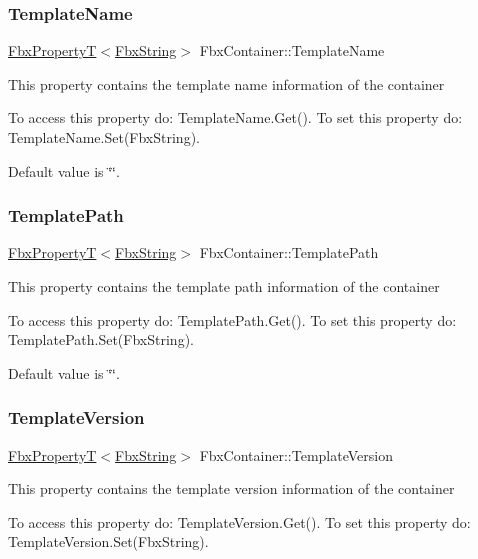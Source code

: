 \subsubsection{\texorpdfstring{Template\+Name}{TemplateName}}
{\footnotesize\ttfamily \hyperlink{class_fbx_property_t}{Fbx\+PropertyT}$<$\hyperlink{class_fbx_string}{Fbx\+String}$>$ Fbx\+Container\+::\+Template\+Name}

This property contains the template name information of the container

To access this property do\+: Template\+Name.\+Get(). To set this property do\+: Template\+Name.\+Set(\+Fbx\+String).

Default value is \char`\"{}\char`\"{}. \mbox{\label{class_fbx_container_a8d66563e359fda83e5b67017140e97d1}} 
\subsubsection{\texorpdfstring{Template\+Path}{TemplatePath}}
{\footnotesize\ttfamily \hyperlink{class_fbx_property_t}{Fbx\+PropertyT}$<$\hyperlink{class_fbx_string}{Fbx\+String}$>$ Fbx\+Container\+::\+Template\+Path}

This property contains the template path information of the container

To access this property do\+: Template\+Path.\+Get(). To set this property do\+: Template\+Path.\+Set(\+Fbx\+String).

Default value is \char`\"{}\char`\"{}. \mbox{\label{class_fbx_container_a0fcd3f02b0b9df51cfd82902c794e709}} 
\subsubsection{\texorpdfstring{Template\+Version}{TemplateVersion}}
{\footnotesize\ttfamily \hyperlink{class_fbx_property_t}{Fbx\+PropertyT}$<$\hyperlink{class_fbx_string}{Fbx\+String}$>$ Fbx\+Container\+::\+Template\+Version}

This property contains the template version information of the container

To access this property do\+: Template\+Version.\+Get(). To set this property do\+: Template\+Version.\+Set(\+Fbx\+String).

